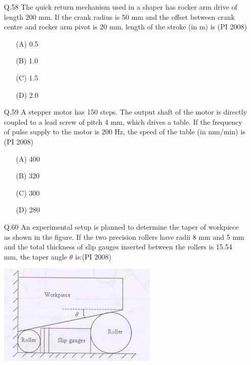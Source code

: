 \documentclass[journal,12pt,onecolumn]{IEEEtran}
\theoremstyle{remark}
\begin{document}
\begin{enumerate}
\item[\textnormal{Q.58}] 
The quick return mechanism used in a shaper has rocker arm drive of length 200 mm. If the crank radius is 50 mm and the offset between crank centre and rocker arm pivot is 20 mm, length of the stroke (in m) is  \hfill{(PI 2008)}
\begin{multicols}{4}
    \begin{enumerate}[label=(\Alph*)]
\item[(A)] 0.5
\item[(B)] 1.0
\item[(C)] 1.5
\item[(D)] 2.0
\end{enumerate}
\end{multicols}
\vspace{1cm}
\item[\textnormal{Q.59}]
A stepper motor has 150 steps. The output shaft of the motor is directly coupled to a lead screw of pitch 4 mm, which drives a table. If the frequency of pulse supply to the motor is 200 Hz, the speed of the table (in mm/min) is  \hfill{(PI 2008)}
\begin{multicols}{4}
    \begin{enumerate}[label=(\Alph*)]
\item[(A)] 400
\item[(B)] 320
\item[(C)] 300
\item[(D)] 280
\end{enumerate}
\end{multicols}
\vspace{1cm}


\item[\textnormal{Q.60}]
An experimental setup is planned to determine the taper of workpiece as shown in the figure. If the two precision rollers have radii 8 mm and 5 mm and the total thickness of slip gauges inserted between the rollers is 15.54 mm, the taper angle $\theta$ is:\hfill{(PI 2008)}

\begin{center}
    \includegraphics[width=0.6\textwidth]{figures/GATE-pi-2008-60.png}
\end{center}


\end{enumerate}
\end{document}
